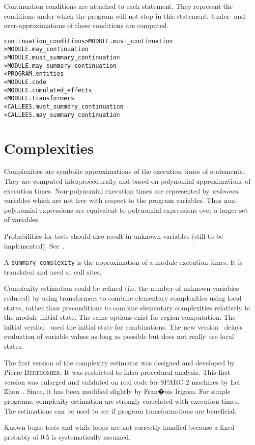 \documentclass[a4paper]{report}
\newenvironment{PipsMake}{\begin{alltt}}{\end{alltt}}
\newenvironment{PipsPass}[1]{\label{pass:#1}}{}
\begin{document}
Continuation conditions are attached to each statement. They represent the
conditions under which the program will not stop in this statement. Under-
and over-approximations of these conditions are computed.

\begin{PipsMake}
continuation_conditions > MODULE.must_continuation
                        > MODULE.may_continuation
                        > MODULE.must_summary_continuation
                        > MODULE.may_summary_continuation
        < PROGRAM.entities
        < MODULE.code
        < MODULE.cumulated_effects
        < MODULE.transformers
        < CALLEES.must_summary_continuation
        < CALLEES.may_summary_continuation
\end{PipsMake}


\section{Complexities}
\label{subsection-complexities}

\begin{PipsPass}{complexities}
Complexities are symbolic approximations of the execution times of
statements. They are computed interprocedurally and based on polynomial
approximations of execution times. Non-polynomial execution times are
represented by {\em unknown} variables which are not free with respect
to the program variables. Thus non-polynomial expressions are equivalent
to polynomial expressions over a larger set of variables.

Probabilities for tests should also result in
unknown variables (still to be implemented). See~\cite{Zho94}.

A \verb+summary_complexity+ is the approximation of a module execution
times. It is translated and used at call sites.

Complexity estimation could be refined (i.e. the number of unknown
variables reduced) by using transformers to combine elementary
complexities using local states, rather than preconditions to combine
elementary complexities relatively to the module initial state. The same
options exist for region computation. The initial version~\cite{Pla90}
used the initial state for combinations. The new version~\cite{CI95}
delays evaluation of variable values as long as possible but does not
really use local states.

The first version of the complexity estimator was designed and
developed by Pierre \textsc{Berthomier}. It was restricted to intra-procedural
analysis. This first version was enlarged and validated on real code for
SPARC-2 machines by Lei Z{\sc hou}~\cite{Zho94}. Since, it has been modified
slightly by Fran�ois I{\sc rigoin}. For simple programs, complexity
estimation are strongly correlated with execution times. The estimations
can be used to see if program transformations are beneficial.

Known bugs: tests and while loops are not correctly handled because a
fixed probably of 0.5 is systematically assumed.
\end{PipsPass}
\end{document}
